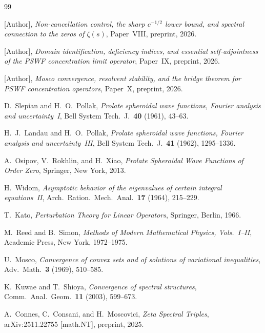 \documentclass[12pt,a4paper]{amsart}
\theoremstyle{definition}
\theoremstyle{remark}
\begin{document}
\begin{thebibliography}{99}

[Author],
\textit{Non-cancellation control, the sharp
$c^{-1/2}$ lower bound, and spectral connection
to the zeros of $\zeta(s)$},
Paper~VIII, preprint, 2026.

[Author],
\textit{Domain identification, deficiency indices,
and essential self-adjointness of the PSWF
concentration limit operator},
Paper~IX, preprint, 2026.

[Author],
\textit{Mosco convergence, resolvent stability,
and the bridge theorem for PSWF
concentration operators},
Paper~X, preprint, 2026.

D.~Slepian and H.~O.~Pollak,
\textit{Prolate spheroidal wave functions,
Fourier analysis and uncertainty~I},
Bell System Tech.\ J.\ \textbf{40} (1961), 43--63.

H.~J.~Landau and H.~O.~Pollak,
\textit{Prolate spheroidal wave functions,
Fourier analysis and uncertainty~III},
Bell System Tech.\ J.\ \textbf{41} (1962),
1295--1336.

A.~Osipov, V.~Rokhlin, and H.~Xiao,
\textit{Prolate Spheroidal Wave Functions
of Order Zero},
Springer, New York, 2013.

H.~Widom,
\textit{Asymptotic behavior of the eigenvalues
of certain integral equations~II},
Arch.\ Ration.\ Mech.\ Anal.\ \textbf{17}
(1964), 215--229.

T.~Kato,
\textit{Perturbation Theory for
Linear Operators},
Springer, Berlin, 1966.

M.~Reed and B.~Simon,
\textit{Methods of Modern Mathematical Physics,
Vols.~I--II},
Academic Press, New York, 1972--1975.

U.~Mosco,
\textit{Convergence of convex sets and of
solutions of variational inequalities},
Adv.\ Math.\ \textbf{3} (1969), 510--585.

K.~Kuwae and T.~Shioya,
\textit{Convergence of spectral structures},
Comm.\ Anal.\ Geom.\ \textbf{11} (2003),
599--673.

A.~Connes, C.~Consani, and H.~Moscovici,
\textit{Zeta Spectral Triples},
arXiv:2511.22755 [math.NT], preprint, 2025.

\end{thebibliography}
\end{document}
